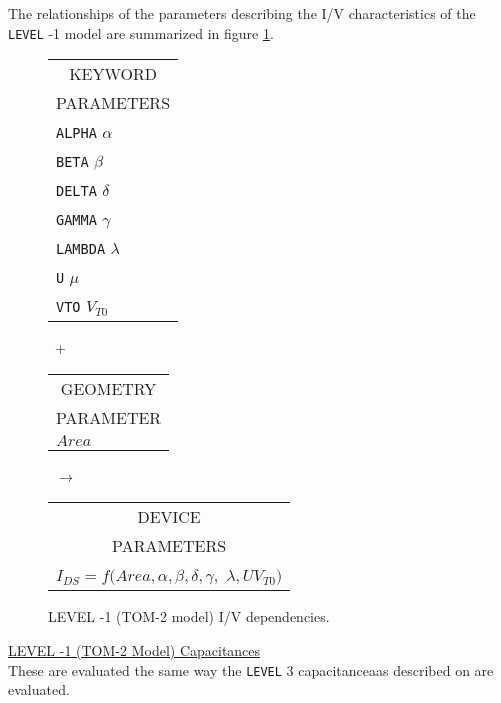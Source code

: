 The relationships of the parameters describing the I/V
characteristics of the {\tt LEVEL} -1 model are summarized in figure
\ref{blevel-1i/v}.\\[0.1in]
\begin{figure}[h]
\begin{tabular}[t]{|p{1in}|}
\hline
\multicolumn{1}{|c|}{KEYWORD} \\
\multicolumn{1}{|c|}{PARAMETERS} \\
\hline
\hline
{\tt ALPHA} \hfill $\alpha$\\
{\tt BETA} \hfill $\beta$\\
{\tt DELTA} \hfill $\delta$\\
{\tt GAMMA} \hfill $\gamma$\\
{\tt LAMBDA} \hfill $\lambda$\\
{\tt U} \hfill $\mu$\\
{\tt VTO} \hfill $V_{T0}$\\
\hline
\end{tabular}
\hfill
\parbox{0.2in}{\ \vspace*{0.2in}\newline +}
\hfill
\begin{tabular}[t]{|p{1in}|}
\hline
\multicolumn{1}{|c|}{GEOMETRY} \\
\multicolumn{1}{|c|}{PARAMETER} \\
\hline
\hspace*{\fill}$Area$\\
\hline
\end{tabular}
\hfill
\parbox{0.2in}{\ \vspace*{0.2in}\newline $\rightarrow$}
\hfill
\begin{tabular}[t]{|p{1.8in}|}
\hline
\multicolumn{1}{|c|}{DEVICE} \\
\multicolumn{1}{|c|}{PARAMETERS} \\
\hline
$I_{DS} = f(Area, \alpha, \beta, \delta, \gamma,$\newline\hspace*{\fill}
$\lambda, U V_{T0})$\\
\hline
\end{tabular}
\caption{LEVEL -1 (TOM-2 model) I/V dependencies. \label{blevel-1i/v}}
\end{figure}
\noindent\underline{\sc LEVEL -1 (TOM-2 Model) Capacitances}\\[0.1in]
These are evaluated the same way the {\tt LEVEL} 3 capacitanceaas
described on \pageref{blevel3cap.txt} are evaluated.

